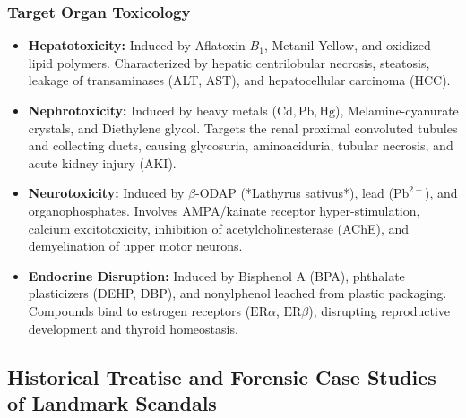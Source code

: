 \documentclass[11pt,a4paper,oneside]{article}
\begin{document}
\subsubsection{Target Organ Toxicology}
\begin{itemize}[leftmargin=*]
    \item \textbf{Hepatotoxicity:} Induced by Aflatoxin $B_1$, Metanil Yellow, and oxidized lipid polymers. Characterized by hepatic centrilobular necrosis, steatosis, leakage of transaminases (ALT, AST), and hepatocellular carcinoma (HCC).
    \item \textbf{Nephrotoxicity:} Induced by heavy metals ($\mathrm{Cd, Pb, Hg}$), Melamine-cyanurate crystals, and Diethylene glycol. Targets the renal proximal convoluted tubules and collecting ducts, causing glycosuria, aminoaciduria, tubular necrosis, and acute kidney injury (AKI).
    \item \textbf{Neurotoxicity:} Induced by $\beta$-ODAP (*Lathyrus sativus*), lead ($\mathrm{Pb}^{2+}$), and organophosphates. Involves AMPA/kainate receptor hyper-stimulation, calcium excitotoxicity, inhibition of acetylcholinesterase (AChE), and demyelination of upper motor neurons.
    \item \textbf{Endocrine Disruption:} Induced by Bisphenol A (BPA), phthalate plasticizers (DEHP, DBP), and nonylphenol leached from plastic packaging. Compounds bind to estrogen receptors ($\mathrm{ER}\alpha$, $\mathrm{ER}\beta$), disrupting reproductive development and thyroid homeostasis.
\end{itemize}

\subsection{Historical Treatise and Forensic Case Studies of Landmark Scandals}
\end{document}
